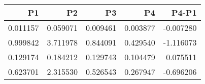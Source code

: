 \begin{tabular}{rrrrr}
\toprule
P1 & P2 & P3 & P4 & P4-P1 \\
\midrule
0.011157 & 0.059071 & 0.009461 & 0.003877 & -0.007280 \\
0.999842 & 3.711978 & 0.844091 & 0.429540 & -1.116073 \\
0.129174 & 0.184212 & 0.129743 & 0.104479 & 0.075511 \\
0.623701 & 2.315530 & 0.526543 & 0.267947 & -0.696206 \\
\bottomrule
\end{tabular}
